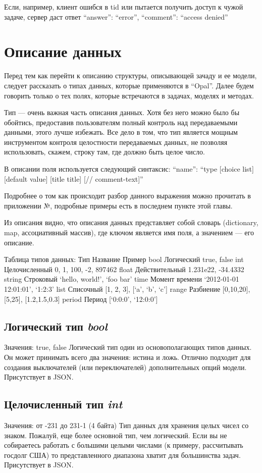 {{Если, например, клиент ошибся в tid или пытается получить доступ к чужой задаче, сервер даст ответ
    {
        “answer”: “error”,
        “comment”: “access denied”
    }
        
\section{Описание данных}

Перед тем как перейти к описанию структуры, описывающей зачаду и ее модели, следует рассказать о типах данных, которые применяются в “Opal”. Далее будем говорить только о тех полях, которые встречаются в задачах, моделях и методах.

Тип --- очень важная часть описания данных. Хотя без него можно было бы обойтись, предоставив пользователям полный контроль над передаваемыми данными, этого лучше избежать. Все дело в том, что тип является мощным инструментом контроля целостности передаваемых данных, не позволяя использовать, скажем, строку там, где должно быть целое число.

В описании поля используется следующий синтаксис:
        “name”: “type [choice list] [default value] [title title]
[// comment-text]”

Подробнее о том как происходит разбор данного выражения можно прочитать в приложении №, подробные примеры есть в последнем пункте этой главы.

Из описания видно, что описания данных представляет собой словарь (dictionary, map, ассоциативный массив), где ключом является имя поля, а значением — его описание.

Таблица типов данных:
Тип
	Название
	Пример
	bool
	Логический
	true, false
	int
	Целочисленный
	0, 1, 100, -2, 897462
	float
	Действительный
	1.231e22, -34.4332
	string
	Строковый
	‘hello, world!’, ‘foo bar’
	time
	Момент времени
	‘2012-01-01 12:01:01’, ‘1:2:3’
	list
	Списочный
	[1, 2, 3], [‘a’, ‘b’, ‘c’]
	range
	Разбиение
	[0,10,20], [5,25], [1.2,1.5,0.3]
	period
	Период
	[‘0:0:0’, ‘12:0:0’]
	
\subsection{Логический тип \emph{bool}}
Значения: true, false
Логический тип один из основополагающих типов данных. Он может принимать всего два значения: истина и ложь. Отлично подходит для создания выключателей (или переключателей) дополнительных опций модели.
Присутствует в JSON.

\subsection{Целочисленный тип \emph{int}}
Значения: от -231 до 231-1 (4 байта)
Тип данных для хранения целых чисел со знаком. Пожалуй, еще более основной тип, чем логический. Если вы не собираетесь работать с большими целыми числами (к примеру, рассчитывать госдолг США) то представленного диапазона хватит для большинства задач.
Присутствует в JSON.

}}
